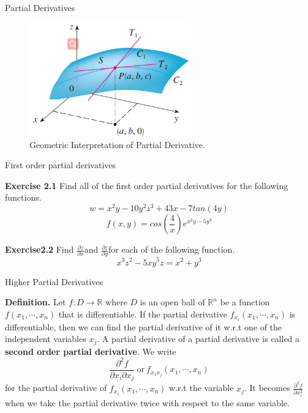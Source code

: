 \documentclass{beamer}
\begin{document}
    \begin{frame}[t]{Partial Derivatives}
        \begin{figure}
            \centering 
            \includegraphics[width = 7cm]{f9.png}
            \caption{Geometric Interpretation of Partial Derivative.}
        \end{figure}
    \end{frame}
    
    \begin{frame}[t]{First order partial derivatives}
        \par \textbf{Exercise 2.1}  Find all of the first order partial derivatives for the following functions.
        \begin{equation*}
            w = x^2y - 10y^2z^3 + 43x - 7tan(4y)
        \end{equation*}
        \begin{equation*}
             f(x,y) = cos(\frac{4}{x})e^{x^2y-5y^3}
        \end{equation*}
        \par \textbf{Exercise2.2} Find $\frac{\partial z}{\partial x}$and $\frac{\partial z}{\partial y}$for each of the following function.
        \begin{equation*}
            x^3z^2 - 5xy^5z = x^2 + y^3
        \end{equation*}
           
    \end{frame}

    \begin{frame}[t]{Higher Partial Derivatives}
        \begin{block}
            \par \textbf{Definition.} Let $f: D \to \mathbb{R}$ where $D$ is an open ball of $\mathbb{R}^n$ be a function $f(x_1,\cdots, x_n)$ that is differentiable. If the partial derivative $f_{x_i} (x_1, \cdots, x_n)$ is differentiable, then we can find the partial derivative of it w.r.t one of the independent variables $x_j$. A partial derivative of a partial derivative is called a \textbf{second order  partial derivative}. We write 
            \begin{equation*}
                \dfrac{\partial^2 f}{\partial x_i \partial x_j} \ \text{or} \ f_{x_1x_j} (x_1, \cdots, x_n)
            \end{equation*}
            for the partial derivative of $f_{x_i} (x_1, \cdots, x_n)$ w.r.t the variable $x_j$. It becomes $\frac{\partial^2 f}{\partial x_i^2}$ when we take the partial derivative twice with respect to the same variable. 
        \end{block}
    \end{frame}
    
\end{document}
